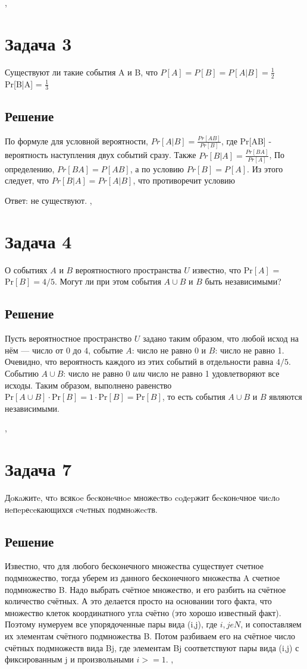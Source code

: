 \documentclass[a4paper,12pt]{article}
\newcommand {\gu} [1] {\guillemotleft#1\guillemotright}
\renewcommand{\Pr} {\text {Pr}}
\begin{document}
    
    \sep
    \section*{Задача 3}
    
    Существуют ли такие события A и B, что $P[A] = P[B] = P[A|B] = \frac{1}{2}$
    Pr[B|A] = $\frac{1}{3}$
    
    \subsection*{Решение}
    
    По формуле для условной вероятности, $Pr[A|B] = \frac{Pr[AB]}{Pr[B]}$, где Pr[AB] - вероятность наступления двух событий сразу.
    Также $Pr[B|A] = \frac{Pr[BA]}{Pr[A]}$, По определению, $Pr[BA] = P[AB]$, а по условию $Pr[B] = P[A]$.
    Из этого следует, что $Pr[B|A] = Pr[A|B]$, что противоречит условию
    
    Ответ: не существуют.
    \sep
	\section*{Задача 4}
	О событиях $A$ и $B$ вероятностного пространства $U$ известно, что $\Pr [A]$ = $\Pr [B] = 4/5$. Могут ли при этом события $A\cup B$ и $B$ быть независимыми?
	
	\subsection*{Решение}
	Пусть вероятностное пространство $U$ задано таким образом, что любой исход на нём --- число от $0$ до $4$, событие $A$: \gu{число не равно 0} и $B$: \gu{число не равно 1}. Очевидно, что вероятность каждого из этих событий в отдельности равна $4/5$. Событию $A\cup B$: \gu{число не равно 0 \textit{или} число не равно 1} удовлетворяют все исходы. Таким образом, выполнено равенство $\Pr [A\cup B]\cdot\Pr [B]=1\cdot\Pr [B] = \Pr[B]$, то есть события $A\cup B$ и $B$ являются независимыми.
	
	\sep
	\section*{Задача 7}
    
    Дoкaжитe, чтo всякoe бecконeчнoe множеcтвo coдepжит бecконeчное чиcлo нeпepеceкающихся cчeтных подмнoжecтв.
    
    \subsection*{Решение}
    Известно, что для любого бесконечного множества существует счетное подмножество, тогда уберем из данного бесконечного множества A счетное подмножество B.
    Надо выбрать счётное множество, и его разбить на счётное количество счётных. А это делается просто на основании того факта, что множество клеток координатного угла счётно (это хорошо известный факт). Поэтому нумеруем все упорядоченные пары вида (i,j), где $i,jeN$, и сопоставляем их элементам счётного подмножества B. Потом разбиваем его на счётное число счётных подмножеств вида Bj, где элементам Bj соответствуют пары вида (i,j) с фиксированным j и произвольными $i>=1$.
    \sep
\end{document}
